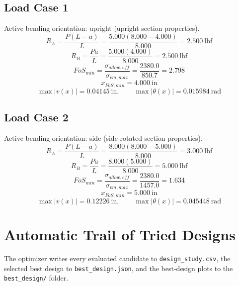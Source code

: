 \documentclass[11pt]{article}
\begin{document}
\subsection*{Load Case 1}
Active bending orientation: upright (upright section properties).
\[R_A = \frac{P(L-a)}{L} = \frac{5.000(8.000-4.000)}{8.000} = 2.500\ \mathrm{lbf}\]
\[R_B = \frac{Pa}{L} = \frac{5.000(4.000)}{8.000} = 2.500\ \mathrm{lbf}\]
\[FoS_{min} = \frac{\sigma_{allow,eff}}{\sigma_{vm,max}} = \frac{2380.0}{850.7} = 2.798\]
\[x_{FoS,min} = 4.000\ \mathrm{in}\]
\[\max |v(x)| = 0.04145\ \mathrm{in}, \qquad \max |\theta(x)| = 0.015984\ \mathrm{rad}\]
\subsection*{Load Case 2}
Active bending orientation: side (side-rotated section properties).
\[R_A = \frac{P(L-a)}{L} = \frac{8.000(8.000-5.000)}{8.000} = 3.000\ \mathrm{lbf}\]
\[R_B = \frac{Pa}{L} = \frac{8.000(5.000)}{8.000} = 5.000\ \mathrm{lbf}\]
\[FoS_{min} = \frac{\sigma_{allow,eff}}{\sigma_{vm,max}} = \frac{2380.0}{1457.0} = 1.634\]
\[x_{FoS,min} = 5.000\ \mathrm{in}\]
\[\max |v(x)| = 0.12226\ \mathrm{in}, \qquad \max |\theta(x)| = 0.045448\ \mathrm{rad}\]

\section*{Automatic Trail of Tried Designs}
The optimizer writes every evaluated candidate to \texttt{design\_study.csv}, the selected best design to \texttt{best\_design.json}, and the best-design plots to the \texttt{best\_design/} folder.
\end{document}
